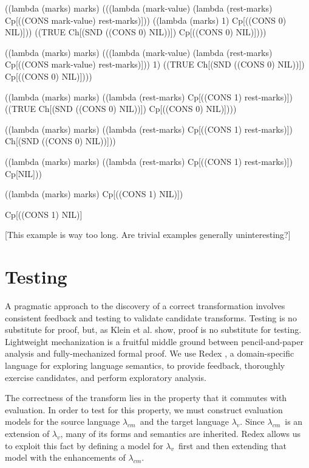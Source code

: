 \documentclass{llncs}
\newcommand{\cm}[0]{$\lambda_{cm}$}
\newcommand{\lv}[0]{$\lambda_v$}
\begin{document}
\begin{schemedisplay}
((lambda (marks) marks)
 (((lambda (mark-value) (lambda (rest-marks) Cp[((CONS mark-value) rest-marks)]))
   ((lambda (marks) 1) Cp[((CONS 0) NIL)]))
  ((TRUE Ch[(SND ((CONS 0) NIL))]) Cp[((CONS 0) NIL)])))

((lambda (marks) marks)
 (((lambda (mark-value) (lambda (rest-marks) Cp[((CONS mark-value) rest-marks)]))
   1)
  ((TRUE Ch[(SND ((CONS 0) NIL))]) Cp[((CONS 0) NIL)])))

((lambda (marks) marks)
 ((lambda (rest-marks) Cp[((CONS 1) rest-marks)])
  ((TRUE Ch[(SND ((CONS 0) NIL))]) Cp[((CONS 0) NIL)])))

((lambda (marks) marks)
 ((lambda (rest-marks) Cp[((CONS 1) rest-marks)])
  Ch[(SND ((CONS 0) NIL))]))

((lambda (marks) marks)
 ((lambda (rest-marks) Cp[((CONS 1) rest-marks)])
  Cp[NIL]))

((lambda (marks) marks)
 Cp[((CONS 1) NIL)])

Cp[((CONS 1) NIL)]
\end{schemedisplay}

[This example is way too long. Are trivial examples generally uninteresting?]



\section{Testing}
\label{sec-testing}

A pragmatic approach to the discovery of a correct transformation involves consistent feedback and testing to validate candidate transforms. Testing is no substitute for proof, but, as Klein et al. \cite{klein2012run} show, proof is no substitute for testing. Lightweight mechanization is a fruitful middle ground between pencil-and-paper analysis and fully-mechanized formal proof. We use Redex \cite{findler2010redex}, a domain-specific language for exploring language semantics, to provide feedback, thoroughly exercise candidates, and perform exploratory analysis.

The correctness of the transform lies in the property that it commutes with evaluation. In order to test for this property, we must construct evaluation models for the source language \cm\ and the target language \lv. Since \cm\ is an extension of \lv, many of its forms and semantics are inherited. Redex allows us to exploit this fact by defining a model for \lv\ first and then extending that model with the enhancements of \cm.
\end{document}
